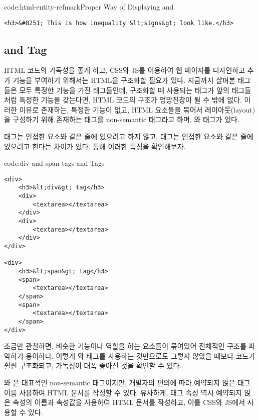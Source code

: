 \begin{codeenv}{code:html-entity-refmark}{Proper Way of Displaying \cd{<} and \cd{>}}\begin{verbatim}
<h3>&#8251; This is how inequality &lt;signs&gt; look like.</h3>
\end{verbatim}
\end{codeenv}

\subsection*{ and  Tag}
HTML 코드의 가독성을 좋게 하고, CSS와 JS를 이용하여 웹 페이지를 디자인하고 추가 기능을 부여하기 위해서는 HTML을 구조화할 필요가 있다. 지금까지 살펴본 태그들은 모두 특정한 기능을 가진 태그들인데, 구조화할 때 사용되는 태그가 앞의 태그들처럼 특정한 기능을 갖는다면, HTML 코드의 구조가 엉망진창이 될 수 밖에 없다. 이러한 이유로 존재하는, 특정한 기능이 없고, HTML 요소들을 묶어서 레이아웃(layout)을 구성하기 위해 존재하는 태그를 non-semantic 태그라고 하며, 와  태그가 있다.

 태그는 인접한 요소와 같은 줄에 있으려고 하지 않고,  태그는 인접한 요소와 같은 줄에 있으려고 한다는 차이가 있다. \를 통해 이러한 특징을 확인해보자.

\begin{codeenv}{code:div-and-span-tags}{ and  Tags}\begin{verbatim}
<div>
    <h3>&lt;div&gt; tag</h3>
    <div>
        <textarea></textarea>
    </div>
    <div>
        <textarea></textarea>
    </div>
</div>

<div>
    <h3>&lt;span&gt; tag</h3>
    <span>
        <textarea></textarea>
    </span>
    <span>
        <textarea></textarea>
    </span>
</div>
\end{verbatim}
\end{codeenv}

\를 조금만 관찰하면, 비슷한 기능이나 역할을 하는 요소들이 묶여있어 전체적인 구조를 파악하기 용이하다. 이렇게 와  태그를 사용하는 것만으로도 그렇지 않았을 때보다 코드가 훨씬 구조화되고, 가독성이 대폭 좋아진 것을 확인할 수 있다.

와 은 대표적인 non-semantic 태그이지만, 개발자의 편의에 따라 예약되지 않은 태그 이름 사용하여 HTML 문서를 작성할 수 있다. 유사하게, 태그 속성 역시 예약되지 않은 속성의 이름과 속성값을 사용하여 HTML 문서를 작성하고, 이를 CSS와 JS에서 사용할 수 있다.
